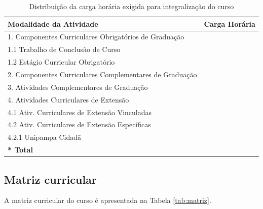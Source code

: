 \begin{table}[htb]
\centering
\caption{Distribuição da carga horária exigida para integralização do curso}
\label{tab:integralizacao}
\begin{tabularx}{\textwidth}{|X|c|}
\hline
\textbf{Modalidade da Atividade} & \textbf{Carga Horária} \\ \hline
1. Componentes Curriculares Obrigatórios de Graduação & \\ \hline
\hspace{0.5cm} 1.1 Trabalho de Conclusão de Curso & \\ \hline
\hspace{0.5cm} 1.2 Estágio Curricular Obrigatório & \\ \hline
2. Componentes Curriculares Complementares de Graduação & \\ \hline
3. Atividades Complementares de Graduação & \\ \hline
4. Atividades Curriculares de Extensão & \\ \hline
\hspace{0.5cm} 4.1 Ativ. Curriculares de Extensão Vinculadas & \\ \hline
\hspace{0.5cm} 4.2 Ativ. Curriculares de Extensão Específicas & \\ \hline
\hspace{1cm} 4.2.1 Unipampa Cidadã & \\ \hline
\textbf{* Total} & \\ \hline
\end{tabularx}
\end{table}

\subsection{Matriz curricular}
A matriz curricular do curso é apresentada na Tabela \ref{tab:matriz}.

\begin{table}[htb]
\centering
\caption{Matriz Curricular do Curso}
\label{tab:matriz}
\end{table}

